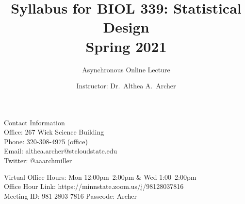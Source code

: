 \documentclass{tufte-handout}
\title{Syllabus for BIOL 339: Statistical Design \\
Spring 2021}										%
\author{Asynchronous Online Lecture}										%
\date{Instructor: Dr.~Althea A.~Archer}
\begin{document}
\maketitle

Contact Information\\
Office: 267 Wick Science Building\\
Phone: 320-308-4975 (office) \\ %
Email: althea.archer@stcloudstate.edu\\
Twitter: @aaarchmiller

\color{gray} Virtual Office Hours: Mon 12:00pm--2:00pm \& Wed 1:00--2:00pm\\
Office Hour Link: https://minnstate.zoom.us/j/98128037816\\
Meeting ID: 981 2803 7816 Passcode: Archer \color{black}
\end{document}
